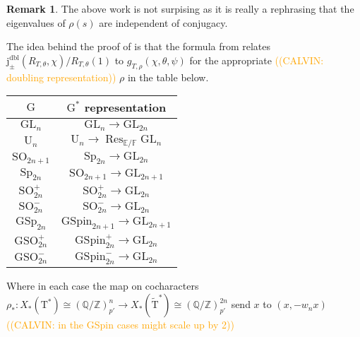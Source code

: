 \documentclass[12pt, reqno]{amsart}
\theoremstyle{definition}
\theoremstyle{definition}
\newtheorem{remark}[theorem]{Remark}
\theoremstyle{definition}
\newcommand{\GL}{\mathrm{GL}}
\newcommand{\SO}{\mathrm{SO}}
\newcommand{\GSO}{\mathrm{GSO}}
\newcommand{\Sp}{\mathrm{Sp}}
\newcommand{\GSp}{\mathrm{GSp}}
\newcommand{\UnitaryGroup}{\mathrm{U}}
\newcommand{\aFieldNorm}{\mathrm{N}}
\newcommand{\finiteField}{\mathbb{F}}
\newcommand{\quadraticExtension}{\mathbb{E}}
\newcommand{\finiteFieldExtension}[1]{\finiteField_{#1}}
\newcommand{\NormOneGroup}[1]{\finiteFieldExtension{#1}^{\aFieldNorm = 1}}
\newcommand{\restrictionOfScalars}[3]{\operatorname{Res}_{#1 \slash #2}{#3}}
\newcommand{\dblVirtualJacobiSumScalar}[2]{\mathrm{j}_{\pm}^{\mathrm{dbl}}\left(#1, #2\right)}
\newcommand{\algebraicGroup}[1]{\boldsymbol{\mathrm{#1}}}
\newcommand{\calvin}[1]{\textcolor{orange}{\sffamily ((CALVIN: #1))}}
\begin{document}
\begin{remark}
	The above work is not surpising as it is really a rephrasing that the eigenvalues of $\rho(s)$ are independent of conjugacy.
\end{remark}

The idea behind the proof of  is that the formula from  relates $\dblVirtualJacobiSumScalar{R_{T, \theta}}{\chi}/R_{T,\theta}(1)$ to $g_{T,\rho}(\chi,\theta,\psi)$ for the appropriate \calvin{doubling representation} $\rho$ in the table below. 

\begin{center}
	\begin{tabular}{|c|c|} \hline
		$\algebraicGroup{G}$ & $\algebraicGroup{G}^*$ representation  \tabularnewline \hline \hline
		$\algebraicGroup{GL}_n$ &  $\algebraicGroup{\GL}_n \to \algebraicGroup{GL}_{2n}$ \tabularnewline \hline
		$\algebraicGroup{\UnitaryGroup}_{n}$ &  $\algebraicGroup{\UnitaryGroup}_{n} \to \restrictionOfScalars{\quadraticExtension}{\finiteField}{\algebraicGroup{GL}_n}$\tabularnewline \hline		 				 
		$\algebraicGroup{\SO}_{2n+1}$ &$\algebraicGroup{\Sp}_{2n} \to \algebraicGroup{\GL}_{2n}$ \tabularnewline \hline
		$\algebraicGroup{\Sp}_{2n}$  &$\algebraicGroup{\SO}_{2n+1}\to \algebraicGroup{\GL}_{2n+1}$\tabularnewline \hline		 
		$\algebraicGroup{\SO}^{+}_{2n}$ &$\algebraicGroup{\SO}^{+}_{2n}\to \algebraicGroup{\GL}_{2n}$\tabularnewline \hline
		$\algebraicGroup{\SO}^{-}_{2n}$ &$\algebraicGroup{\SO}^{-}_{2n}\to \algebraicGroup{\GL}_{2n}$\tabularnewline \hline
		$\algebraicGroup{\GSp}_{2n}$  &$\algebraicGroup{GSpin}_{2n+1}\to \algebraicGroup{\GL}_{2n+1}$ \tabularnewline \hline
		$\algebraicGroup{\GSO}^{+}_{2n}$ & $\algebraicGroup{GSpin}_{2n}^{+}\to\algebraicGroup{\GL}_{2n}$ \tabularnewline \hline
		$\algebraicGroup{\GSO}^{-}_{2n}$& $\algebraicGroup{GSpin}_{2n}^{-}\to\algebraicGroup{\GL}_{2n}$\tabularnewline \hline
	\end{tabular}
\end{center}
Where in each case the map on cocharacters $\rho_*:X_*(\algebraicGroup{T}^*) \cong (\mathbb{Q}/\mathbb{Z})_{p'}^n \to X_*(\tilde{\algebraicGroup{T}}^*) \cong (\mathbb{Q}/\mathbb{Z})_{p'}^{2n}$ send $x$ to $(x,-w_n x)$ \calvin{in the GSpin cases might scale up by 2}
\end{document}
